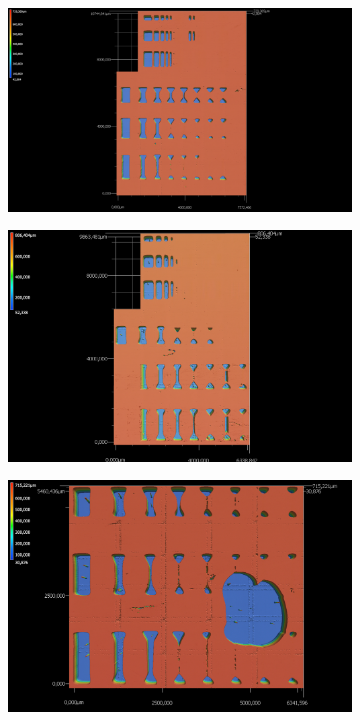 \begin{figure}[htb!]
\begin{subfigure}[l]{0.3\linewidth}
\centering
\includegraphics[clip, trim=0 0mm 50 0, width=\linewidth]{img/10um-05min-Folie-3d.png}
\end{subfigure}%
\hspace{6mm}
\begin{subfigure}[c]{0.3\linewidth}
\centering
\includegraphics[clip, trim=0 0mm 0 0,width=\linewidth]{img/10um-10min-Folie-3d.png}
\end{subfigure}%
\hspace{6mm}
\begin{subfigure}[r]{0.3\linewidth}
\centering
\includegraphics[clip, trim=0 0mm 0 0,width=\linewidth]{img/10um-30min-Folie-3d.png}

\end{subfigure}
\end{figure}
